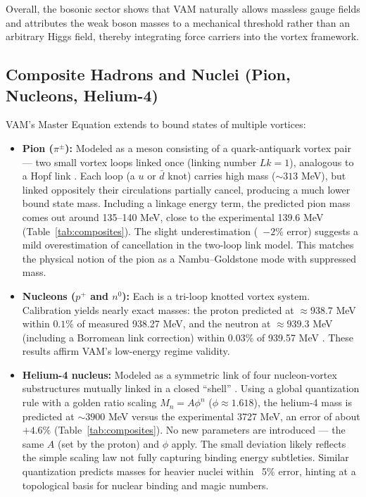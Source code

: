 Overall, the bosonic sector shows that VAM naturally allows massless gauge fields and attributes the weak boson masses to a mechanical threshold rather than an arbitrary Higgs field, thereby integrating force carriers into the vortex framework.

\subsection{Composite Hadrons and Nuclei (Pion, Nucleons, Helium-4)}

VAM’s Master Equation extends to bound states of multiple vortices:

\begin{itemize}
    \item \textbf{Pion ($\pi^{\pm}$):} Modeled as a meson consisting of a quark-antiquark vortex pair — two small vortex loops linked once (linking number $Lk=1$), analogous to a Hopf link \cite{Iskandarani2025f}. Each loop (a $u$ or $\bar{d}$ knot) carries high mass ($\sim 313$ MeV), but linked oppositely their circulations partially cancel, producing a much lower bound state mass. Including a linkage energy term, the predicted pion mass comes out around 135–140 MeV, close to the experimental 139.6 MeV (Table~\ref{tab:composites}). The slight underestimation (~$-2\%$ error) suggests a mild overestimation of cancellation in the two-loop link model. This matches the physical notion of the pion as a Nambu–Goldstone mode with suppressed mass.

    \item \textbf{Nucleons ($p^+$ and $n^0$):} Each is a tri-loop knotted vortex system. Calibration yields nearly exact masses: the proton predicted at $\approx 938.7$ MeV within $0.1\%$ of measured 938.27 MeV, and the neutron at $\approx 939.3$ MeV (including a Borromean link correction) within $0.03\%$ of 939.57 MeV \cite{Iskandarani2025f}. These results affirm VAM’s low-energy regime validity.

    \item \textbf{Helium-4 nucleus:} Modeled as a symmetric link of four nucleon-vortex substructures mutually linked in a closed “shell” \cite{Iskandarani2025f}. Using a global quantization rule with a golden ratio scaling $M_n = A \phi^n$ ($\phi \approx 1.618$), the helium-4 mass is predicted at $\sim 3900$ MeV versus the experimental 3727 MeV, an error of about $+4.6\%$ (Table~\ref{tab:composites}). No new parameters are introduced — the same $A$ (set by the proton) and $\phi$ apply. The small deviation likely reflects the simple scaling law not fully capturing binding energy subtleties. Similar quantization predicts masses for heavier nuclei within ~5\% error, hinting at a topological basis for nuclear binding and magic numbers.
\end{itemize}

